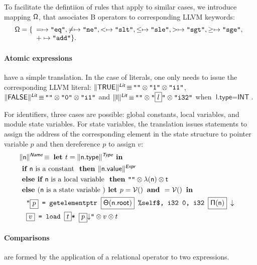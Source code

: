 \documentclass{llncs}
\newcommand{\trad}[2]{\ensuremath{\lVert \textsf{#1} \rVert^{\textit{#2}}}}
\newcommand{\nl}[0]{\ensuremath{\downarrow}}
\DeclareMathOperator{\isdef}{\equiv}
\DeclareMathOperator{\variable}{\mathcal{V}()}
\newcommand{\llvm}[1]{\texttt{#1}}
\newcommand{\B}[1]{\textsf{#1}}
\newcommand{\IF}[0]{\textbf{ if }}
\newcommand{\ELSIF}[0]{\textbf{ else if }}
\newcommand{\ELSE}[0]{\textbf{ else }}
\newcommand{\THEN}[0]{\textbf{ then }}
\newcommand{\LET}[0]{\textbf{ let }}
\newcommand{\IN}[0]{\textbf{ in }}
\newcommand{\AND}[1]{\textbf{ and }}
\newcommand{\PH}[1]{\framebox{$#1$}}
\newcommand{\sep}[0]{\otimes}
\newcommand{\local}[0]{\ensuremath{\sf\lambda}}
\newcommand{\opmap}[0]{\ensuremath{\sf\Omega}}
\newcommand{\idx}[0]{\ensuremath{\sf\Pi}}
\newcommand{\state}[0]{\ensuremath{\sf\Theta}}
\begin{document}
To facilitate the defintiion of rules that apply to similar cases, we introduce
mapping $\opmap$, that associates B operators to corresponding LLVM keywords:
$$\opmap = \{
\begin{array}[t]{l}
  = \mapsto \llvm{"eq"},
  \ne \mapsto \llvm{"ne"},
  < \mapsto \llvm{"slt"},
  \le \mapsto \llvm{"sle"},
  > \mapsto \llvm{"sgt"},
  \ge \mapsto \llvm{"sge"}, \\
  + \mapsto \llvm{"add"} \}.
  \end{array}
$$

\paragraph{Atomic expressions} have a simple translation. In the case of
literals, one only needs to issue the corresponding LLVM literal:
$\trad{TRUE}{\B{Lit}} \isdef \llvm{""} \sep \llvm{"1"} \sep \llvm{"i1"}$,
$\trad{FALSE}{\B{Lit}} \isdef \llvm{""} \sep \llvm{"0"} \sep \llvm{"i1"}$ and
$\trad{l}{\B{Lit}} \isdef \llvm{""} \sep \llvm{"\PH{l}"} \sep \llvm{"i32"}$ when
$\B{l.type} = \B{INT}$.

For identifiers, three cases are possible: global constants, local variables,
and module state variables. For state variables, the translation issues
statements to assign the address of the corresponding element in the state
structure to pointer variable $p$ and then dereference $p$ to assign $v$:
\begin{align*}
\lefteqn{\trad{n}{\B{Name}} \isdef \LET t = \trad{n.type}{\B{Type}} \IN} \\
& \IF \B{n} \mbox{ is a constant } \THEN \trad{n.value}{\B{Expr}} \\
& \ELSIF \B{n} \mbox{ is a local variable } \THEN
\llvm{""} \sep \local(\B{n}) \sep t \\
& \ELSE (\B{n} \mbox{ is a state variable }) \LET p = \variable \AND v = \variable \IN \\
& \quad \llvm{"\PH{p} = getelementptr \PH{\state(\B{n.root})} \%self\$, i32 0, i32 \PH{\idx(\B{n})} \nl} \\
& \quad \llvm{\PH{v} = load \PH{t}* \PH{p}\nl"} \sep v \sep t
\end{align*}

\paragraph{Comparisons} are formed by the application of a relational operator
to two expressions.
\end{document}

